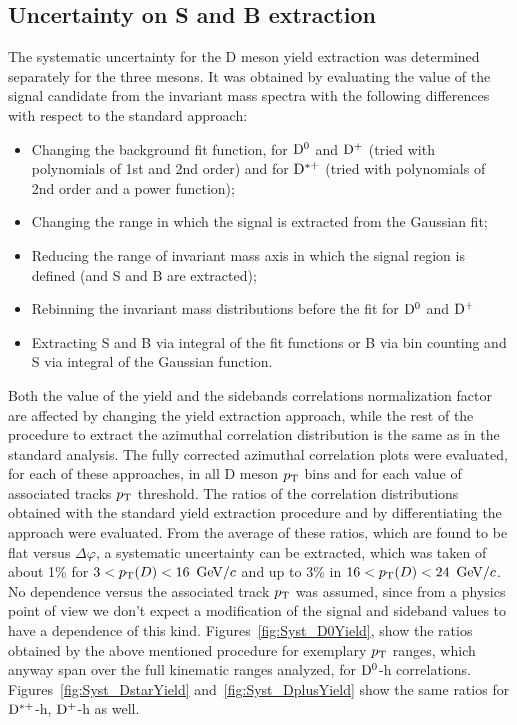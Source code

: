 \subsection{Uncertainty on S and B extraction}

The systematic uncertainty for the D meson yield extraction was determined separately for the three mesons. It was obtained by evaluating the value of the signal candidate from the invariant mass spectra with the following differences with respect to the standard approach:
\begin{itemize}
    \item Changing the background fit function, for ${\rm D^0}$ and ${\rm D^+}$ (tried with polynomials of 1st and 2nd order) and for ${\rm D^{*+}}$ (tried with polynomials of 2nd order and a power function);
    \item Changing the range in which the signal is extracted from the Gaussian fit;
    \item Reducing the range of invariant mass axis in which the signal region is defined (and S and B are extracted);
    \item Rebinning the invariant mass distributions before the fit for ${\rm D^0}$ and ${\rm D^+}$
    \item Extracting S and B via integral of the fit functions or B via bin counting and S via integral of the Gaussian function.
\end{itemize}

Both the value of the yield and the sidebands correlations normalization factor are affected by changing the yield extraction approach, while the rest of the procedure to extract the azimuthal correlation distribution is the same as in the standard analysis. The fully corrected azimuthal correlation plots were evaluated, for each of these approaches, in all D meson $p_{\rm T}$ bins and for each value of associated tracks $p_{\rm T}$ threshold.
The ratios of the correlation distributions obtained with the standard yield extraction procedure and by differentiating the approach were evaluated. From the average of these ratios, which are found to be flat versus $\Delta\varphi$, a systematic uncertainty can be extracted, which was taken of about 1\% for $3 < p_{\rm T}(D) < 16$ $\mathrm{GeV}/c$ and up to 3\% in $16 < p_{\rm T}(D) < 24$ $\mathrm{GeV}/c$. No dependence versus the associated track $p_{\rm T}$ was assumed, since from a physics point of view we don't expect a modification of the signal and sideband values to have a dependence of this kind.
Figures~\ref{fig:Syst_D0Yield}, show the ratios obtained by the above mentioned procedure for exemplary $p_{\rm T}$ ranges, which anyway span over the full kinematic ranges analyzed, for ${\rm D^0}$-h correlations. Figures~\ref{fig:Syst_DstarYield} and~\ref{fig:Syst_DplusYield} show the same ratios for ${\rm D^{*+}}$-h, ${\rm D^+}$-h as well.

